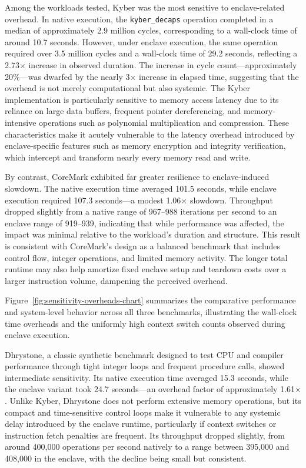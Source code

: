 Among the workloads tested, Kyber was the most sensitive to enclave-related overhead. In native execution, the \texttt{kyber\_decaps} operation completed in a median of approximately 2.9 million cycles, corresponding to a wall-clock time of around 10.7 seconds. However, under enclave execution, the same operation required over 3.5 million cycles and a wall-clock time of 29.2 seconds, reflecting a 2.73$\times$ increase in observed duration. The increase in cycle count—approximately 20\%—was dwarfed by the nearly 3$\times$ increase in elapsed time, suggesting that the overhead is not merely computational but also systemic. The Kyber implementation is particularly sensitive to memory access latency due to its reliance on large data buffers, frequent pointer dereferencing, and memory-intensive operations such as polynomial multiplication and compression. These characteristics make it acutely vulnerable to the latency overhead introduced by enclave-specific features such as memory encryption and integrity verification, which intercept and transform nearly every memory read and write.

By contrast, CoreMark exhibited far greater resilience to enclave-induced slowdown. The native execution time averaged 101.5 seconds, while enclave execution required 107.3 seconds—a modest 1.06$\times$ slowdown. Throughput dropped slightly from a native range of 967--988 iterations per second to an enclave range of 919--939, indicating that while performance was affected, the impact was minimal relative to the workload's duration and structure. This result is consistent with CoreMark’s design as a balanced benchmark that includes control flow, integer operations, and limited memory activity. The longer total runtime may also help amortize fixed enclave setup and teardown costs over a larger instruction volume, dampening the perceived overhead.

Figure~\ref{fig:sensitivity-overheads-chart} summarizes the comparative performance and system-level behavior across all three benchmarks, illustrating the wall-clock time overheads and the uniformly high context switch counts observed during enclave execution.

Dhrystone, a classic synthetic benchmark designed to test CPU and compiler performance through tight integer loops and frequent procedure calls, showed intermediate sensitivity. Its native execution time averaged 15.3 seconds, while the enclave variant took 24.7 seconds—an overhead factor of approximately 1.61$\times$. Unlike Kyber, Dhrystone does not perform extensive memory operations, but its compact and time-sensitive control loops make it vulnerable to any systemic delay introduced by the enclave runtime, particularly if context switches or instruction fetch penalties are frequent. Its throughput dropped slightly, from around 400,000 operations per second natively to a range between 395,000 and 408,000 in the enclave, with the decline being small but consistent.

